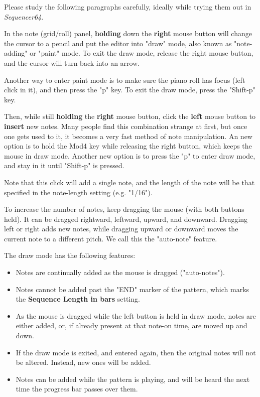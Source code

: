    Please study the following paragraphs carefully, ideally while
   trying them out in \textsl{Sequencer64}.

	In the note (grid/roll) panel, \textbf{holding}
	down the \textbf{right} mouse button will change the cursor
	to a pencil and put the editor into "draw" mode, also known as
   "note-adding" or "paint" mode.
   To exit the draw mode, release the right mouse button, and the cursor will
   turn back into an arrow.

   Another way to enter paint mode is to make sure the piano roll has focus
   (left click in it), and then press the "p" key.
   To exit the draw mode, press the "Shift-p" key.

   Then, while still \textbf{holding} the \textbf{right} mouse button, click
   the \textbf{left} mouse button to \textbf{insert} new notes.  Many people
   find this combination strange at first, but once one gets used to it, it
   becomes a very fast method of note manipulation.  An new option is to
   hold the Mod4 key while releasing the right button, which keeps the mouse
   in draw mode.  Another new option is to press the "p" to enter draw mode,
   and stay in it until "Shift-p" is pressed.

   Note that this click will add a single note, and the length of the note will
   be that specified in the note-length setting (e.g. "1/16").

   To increase the number of notes, keep dragging the mouse (with
   both buttons held).  It can be dragged rightward, leftward, upward, and
   downward.  Dragging left or right adds new notes, while dragging upward or
   downward moves the current note to a different pitch.
   We call this the "auto-note" feature.

   The draw mode has the following features:

   \begin{itemize}
      \item Notes are continually added as the mouse is dragged ("auto-notes").
      \item Notes cannot be added past the "END" marker of the pattern, which
         marks the \textbf{Sequence Length in bars} setting.
      \item As the mouse is dragged while the left button is held in draw mode,
         notes are either added, or, if already present at that note-on time,
         are moved up and down.
      \item If the draw mode is exited, and entered again, then the original
         notes will not be altered.  Instead, new ones will be added.
      \item Notes can be added while the pattern is playing, and will be heard
         the next time the progress bar passes over them.
   \end{itemize}

